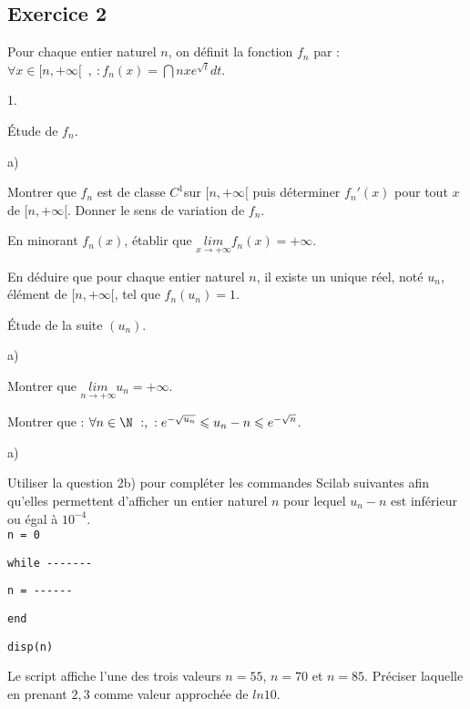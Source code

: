 \documentclass[11pt]{article}%
\begin{document}
\subsection*{{\normalsize{}Exercice 2}}

Pour chaque entier naturel $n$, on définit la fonction $f_{n}$
par : $\forall x\in[n, + \infty[ \ \;,\ :f_{n}(x) =
\dint{n}{x}e^{\sqrt{t}}dt$. 
\begin{noliste}{1.}
 \setlength{\itemsep}{4mm}
\item Étude de $f_{n}$.

\begin{noliste}{a)}
 \setlength{\itemsep}{2mm}
\item Montrer que $f_{n}$ est de classe $C^{1}$sur $[n, + \infty[$ puis
déterminer $f_{n}{'}(x)$ pour tout $x$ de $[n, + \infty[$. Donner
le sens de variation de $f_{n}$. 
\item En minorant $f_{n}(x)$, établir que $\underset{x\rightarrow +
\infty}{lim}f_{n}(x) = + \infty$. 
\item En déduire que pour chaque entier naturel $n$, il existe un
unique
réel, noté $u_{n}$, élément de $[n, + \infty[$, tel que $f_{n}(u_{n}) =
1$. 
\end{noliste}
\item Étude de la suite $(u_{n})$.

\begin{noliste}{a)}
 \setlength{\itemsep}{2mm}
\item Montrer que $\underset{n\rightarrow + \infty}{lim}u_{n} = +
\infty$. 
\item Montrer que : $\forall n\in\N\ :,\ :e^{-\sqrt{u_{n}}}\leq
u_{n}-n\leq e^{-\sqrt{n}}$. 
\end{noliste}
\item 

\begin{noliste}{a)}
 \setlength{\itemsep}{2mm}
\item Utiliser la question 2b) pour compléter les commandes Scilab
suivantes
afin qu'elles permettent d'afficher un entier naturel $n$ pour lequel
$u_{n}-n$ est inférieur ou égal à $10^{-4}$.~\\
 \texttt{n = 0}


\texttt{while -{}-{}-{}-{}-{}-{}-}


\texttt{n = -{}-{}-{}-{}-{}-}


\texttt{end}


\texttt{disp(n)}

\item Le script affiche l'une des trois valeurs $n = 55$, $n = 70$ et
$n = 85$. Préciser laquelle en prenant $2,3$ comme valeur approchée de
$ln10$. 
\end{noliste}


\end{noliste}
\end{document}
